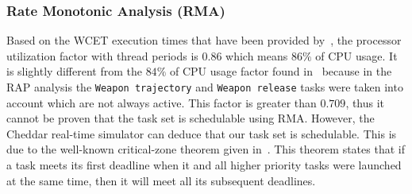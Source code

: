 \subsubsection{Rate Monotonic Analysis (RMA)}
Based on the WCET execution times that have been provided
by~\cite{locke@rtss91}, the processor utilization factor with thread
periods is $0.86$ which means $86\%$ of CPU usage. It is slightly
different from the $84\%$ of CPU usage factor found
in~\cite{locke@rtss91} because in the RAP analysis the \texttt{Weapon
  trajectory} and \texttt{Weapon release} tasks were taken into
account which are not always active. This factor is greater than
$0.709$, thus it cannot be proven that the task set is schedulable
using RMA. However, the Cheddar real-time simulator can deduce that
our task set is schedulable. This is due to the well-known
critical-zone theorem given in~\cite{liu@jacm73, sha@ieeeproc94}. This
theorem states that if a task meets its first deadline when it and all
higher priority tasks were launched at the same time, then it will
meet all its subsequent deadlines.

